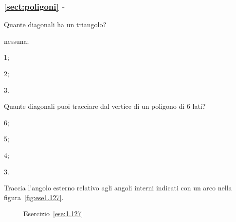 \begingroup
\hypersetup{linkcolor=black}
\subsubsection*{\ref{sect:poligoni} - }
\endgroup

\begin{esercizio}
Quante diagonali ha un triangolo?
\begin{multicols}{4}
\begin{enumeratea}
\item nessuna;
\item 1;
\item 2;
\item 3.
\end{enumeratea}
\end{multicols}
\end{esercizio}

\begin{esercizio}
Quante diagonali puoi tracciare dal vertice di un poligono di 6 lati?
\begin{multicols}{4}
\begin{enumeratea}
\item 6;
\item 5;
\item 4;
\item 3.
\end{enumeratea}
\end{multicols}
\end{esercizio}

\begin{esercizio}
Traccia l'angolo esterno relativo agli angoli interni indicati con un 
arco nella figura~\ref{fig:ese1.127}.
\end{esercizio}


\begin{inaccessibleblock}
 \begin{figure}[htb]
 \centering
 \caption{Esercizio~\ref{ese:1.127}}%
\end{figure}
\end{inaccessibleblock}

